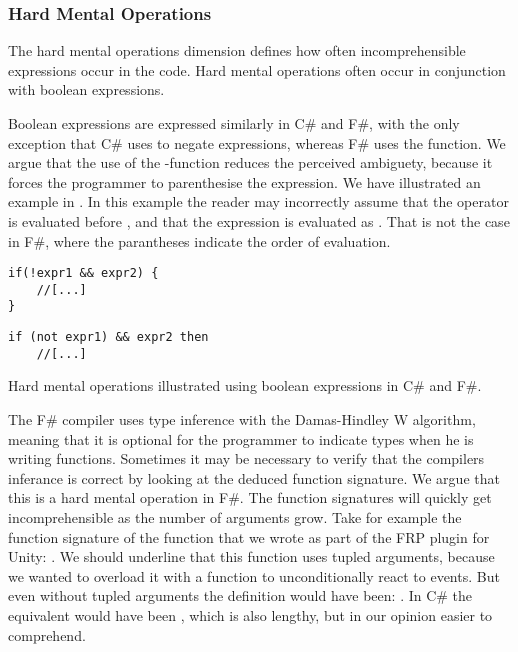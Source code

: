 \subsubsection{Hard Mental Operations}
The hard mental operations dimension defines how often incomprehensible expressions occur in the code. Hard mental operations often occur in conjunction with boolean expressions\cite{green1996usability}.

Boolean expressions are expressed similarly in C\# and F\#, with the only exception that C\# uses \ttt{!} to negate expressions, whereas F\# uses the  function. We argue that the use of the -function reduces the perceived ambiguety, because it forces the programmer to parenthesise the expression. We have illustrated an example in . In this example the reader may incorrectly assume that the \ttt{\&\&} operator is evaluated before \ttt{!}, and that the expression is evaluated as  . That is not the case in F\#, where the parantheses indicate the order of evaluation.

\begin{listing}[H]
    \begin{minipage}{.45\textwidth}
        \begin{verbatim}
if(!expr1 && expr2) {
    //[...]
}
        \end{verbatim}
    \end{minipage}
    \hfill
    \begin{minipage}{.45\textwidth}
        \begin{verbatim}
if (not expr1) && expr2 then
    //[...]
        \end{verbatim}
    \end{minipage}
\caption{Hard mental operations illustrated using boolean expressions in C\# and F\#.}
\label{lst:hard:mental:operations}
\end{listing}

The F\# compiler uses type inference with the Damas-Hindley W algorithm\cite{fsharp:type:inference}, meaning that it is optional for the programmer to indicate types when he is writing functions. Sometimes it may be necessary to verify that the compilers inferance is correct by looking at the deduced function signature. We argue that this is a hard mental operation in F\#. The function signatures will quickly get incomprehensible as the number of arguments grow. Take for example the function signature of the  function that we wrote as part of the \gls{FRP} plugin for Unity: . We should underline that this function uses tupled arguments, because we wanted to overload it with a function to unconditionally react to events. But even without tupled arguments the definition would have been: . In C\# the equivalent would have been , which is also lengthy, but in our opinion easier to comprehend.